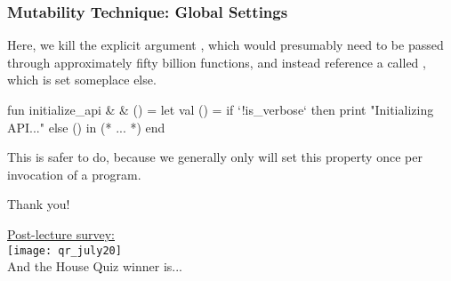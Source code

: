 \documentclass[aspectratio=169]{beamer}
\begin{document}
\begin{frame}[fragile]
  \frametitle{Mutability Technique: Global Settings}

  Here, we kill the explicit argument , which would
  presumably need to be passed through approximately fifty billion functions,
  and instead reference a  called , which is
  set someplace else.

  \pause
  \vspace{\fill}

  \begin{codeblock}
    fun initialize_api & & () =
      let
        val () = if `!is_verbose` then
                   print "Initializing API...\n"
                 else ()
      in
        (* ... *)
      end
  \end{codeblock}

  \pause
  \vspace{\fill}

  This is safer to do, because we generally only will set this property once
  per invocation of a program.
\end{frame}

\begin{frame}[plain]
	\begin{center} Thank you! \end{center}

	\begin{center}
    {\color{blue} \href{https://docs.google.com/forms/d/e/1FAIpQLSf6J6RjAweoMZwnYg5yCL-9_6rlatT5qCrlREywptoCR0Y9Bw/viewform?usp=sf_link}{Post-lecture survey:}} \\
    \vspace{5pt}
    \texttt{[image: qr\_july20]} \\
    \vspace{5pt}
    And the House Quiz winner is...
  \end{center}
\end{frame}
\end{document}
